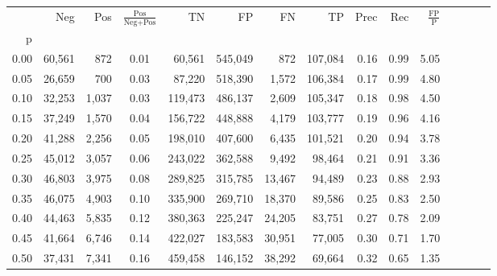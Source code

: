 \begin{tabular}{rrrcrrrrrrrrrrr}
\toprule
{} &     Neg &     Pos & $\frac{\text{Pos}}{\text{Neg}+\text{Pos}}$ &       TN &       FP &       FN &       TP &  Prec &   Rec & $\frac{\text{FP}}{\text{P}}$ \\
p    &         &         &                                            &          &          &          &          &       &       &                              \\
\midrule
0.00 &  60,561 &     872 &                                       0.01 &   60,561 &  545,049 &      872 &  107,084 &  0.16 &  0.99 &                         5.05 \\
0.05 &  26,659 &     700 &                                       0.03 &   87,220 &  518,390 &    1,572 &  106,384 &  0.17 &  0.99 &                         4.80 \\
0.10 &  32,253 &   1,037 &                                       0.03 &  119,473 &  486,137 &    2,609 &  105,347 &  0.18 &  0.98 &                         4.50 \\
0.15 &  37,249 &   1,570 &                                       0.04 &  156,722 &  448,888 &    4,179 &  103,777 &  0.19 &  0.96 &                         4.16 \\
0.20 &  41,288 &   2,256 &                                       0.05 &  198,010 &  407,600 &    6,435 &  101,521 &  0.20 &  0.94 &                         3.78 \\
0.25 &  45,012 &   3,057 &                                       0.06 &  243,022 &  362,588 &    9,492 &   98,464 &  0.21 &  0.91 &                         3.36 \\
0.30 &  46,803 &   3,975 &                                       0.08 &  289,825 &  315,785 &   13,467 &   94,489 &  0.23 &  0.88 &                         2.93 \\
0.35 &  46,075 &   4,903 &                                       0.10 &  335,900 &  269,710 &   18,370 &   89,586 &  0.25 &  0.83 &                         2.50 \\
0.40 &  44,463 &   5,835 &                                       0.12 &  380,363 &  225,247 &   24,205 &   83,751 &  0.27 &  0.78 &                         2.09 \\
0.45 &  41,664 &   6,746 &                                       0.14 &  422,027 &  183,583 &   30,951 &   77,005 &  0.30 &  0.71 &                         1.70 \\
0.50 &  37,431 &   7,341 &                                       0.16 &  459,458 &  146,152 &   38,292 &   69,664 &  0.32 &  0.65 &                         1.35 \\

\end{tabular}
